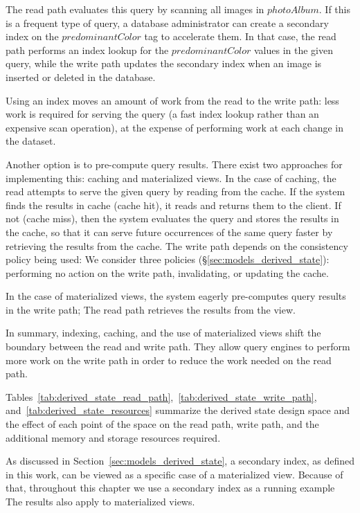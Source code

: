 The read path evaluates this query by scanning all images in $photoAlbum$.
If this is a frequent type of query,
a database administrator can create a secondary index on the $predominantColor$ tag to accelerate them.
In that case, the read path performs an index lookup for the $predominantColor$ values in the given query,
while the write path updates the secondary index when an image is inserted or deleted in the database.

Using an index moves an amount of work from the read to the write path:
less work is required for serving the query (a fast index lookup rather than an expensive scan operation),
at the expense of performing work at each change in the dataset.

Another option is to pre-compute query results.
There exist two approaches for implementing this: caching and materialized views.
In the case of caching, the read attempts to serve the given query by reading from the cache.
If the system finds the results in cache (cache hit), it reads and returns them to the client.
If not (cache miss), then the system evaluates the query and stores the results in the cache,
so that it can serve future occurrences of the same query faster by retrieving the results from the cache.
The write path depends on the consistency policy being used:
We consider three policies (\S\ref{sec:models_derived_state}):
performing no action on the write path, invalidating, or updating the cache.

In the case of materialized views, the system eagerly pre-computes query results in the write path;
The read path retrieves the results from the view.

In summary, indexing, caching, and the use of materialized views shift the boundary between the read and write path.
They allow query engines to perform more work on the write path in order to reduce the work needed on the read path.

Tables~\ref{tab:derived_state_read_path},~\ref{tab:derived_state_write_path}, and~\ref{tab:derived_state_resources} summarize
the derived state design space and the effect of each point of the space on the read path, write path, and the additional
memory and storage resources required.

As discussed in Section~\ref{sec:models_derived_state}, a secondary index,
as defined in this work, can be viewed as a specific case of a materialized view.
Because of that, throughout this chapter we use a secondary index as a running example
The results also apply to materialized views.

